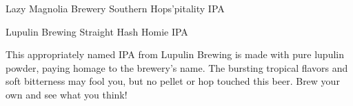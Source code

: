 \begin{recipie}{Lazy Magnolia Brewery Southern Hops'pitality IPA}
\begin{ingredientsblock}
\begin{yeasts}
\end{yeasts}

\end{ingredientsblock}

\end{recipie}

\begin{recipie}{Lupulin Brewing Straight Hash Homie IPA}

\begin{aboutblock}
This appropriately named IPA from Lupulin Brewing is made with pure lupulin powder,
paying homage to the brewery's name. The bursting tropical flavors and soft bitterness
may fool you, but no pellet or hop touched this beer. Brew your own and see what you think!
\end{aboutblock}


\begin{methodandtiming}
 
\begin{mashsteps}
\end{mashsteps}

\begin{fermentationsteps}
\end{fermentationsteps}

\end{methodandtiming}

\pagebreak

\begin{ingredientsblock}

\begin{malts}
\end{malts}

\begin{hops}
\end{hops}

\begin{yeasts}
\end{yeasts}

\end{ingredientsblock}

\end{recipie}

